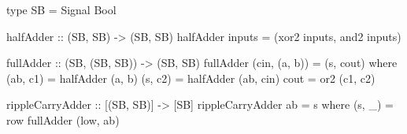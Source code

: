 \begin{haskellcode}
    type SB = Signal Bool

    halfAdder :: (SB, SB) -> (SB, SB)
    halfAdder inputs = (xor2 inputs, and2 inputs)

    fullAdder :: (SB, (SB, SB)) -> (SB, SB)
    fullAdder (cin, (a, b)) = (s, cout)
        where
          (ab, c1) = halfAdder (a, b)
          (s, c2)  = halfAdder (ab, cin)
          cout     = or2 (c1, c2)

    rippleCarryAdder :: [(SB, SB)] -> [SB]
    rippleCarryAdder ab = s
        where (s, _) = row fullAdder (low, ab)
\end{haskellcode}
